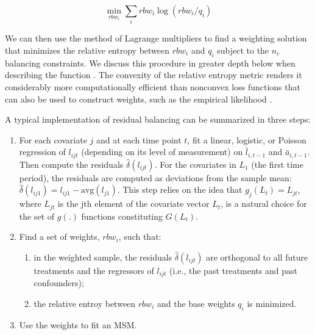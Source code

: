 \begin{equation}
\label{eq:7}
\min_{rbw_{i}}\sum_{i}rbw_{i}\log (rbw_{i}/q_{i})
\end{equation}

We can then use the method of Lagrange multipliers to find a weighting
solution that minimizes the relative entropy between \(rbw_{i}\) and
\(q_{i}\) subject to the \(n_{c}\) balancing constraints. We discuss
this procedure in greater depth below when describing the function
. The convexity of the relative entropy metric renders
it considerably more computationally efficient than nonconvex loss
functions that can also be used to construct weights, such as the
empirical likelihood \citep{fongCovariateBalancingPropensity2018}.

A typical implementation of residual balancing can be summarized in
three steps:

\begin{enumerate}
\def\labelenumi{\arabic{enumi}.}
\tightlist
\item
  For each covariate \(j\) and at each time point \(t\), fit a linear,
  logistic, or Poisson regression of \(l_{ijt}\) (depending on its level
  of measurement) on \(\bar{l}_{i,t-1}\) and \(\bar{a}_{i,t-1}\). Then
  compute the residuals \(\hat{\delta}(l_{ijt})\). For the covariates in
  \(L_{1}\) (the first time period), the residuals are computed as
  deviations from the sample mean:
  \(\hat{\delta}(l_{ij1})=l_{ij1}-\text{avg}(l_{j1})\). This step relies
  on the idea that \(g_{j}(L_{t})=L_{jt}\), where \(L_{jt}\) is the jth
  element of the covariate vector \(L_{t}\), is a natural choice for the
  set of \(g(.)\) functions constituting \(G(L_{t})\).
\item
  Find a set of weights, \(rbw_{i}\), such that:

  \begin{enumerate}
  \def\labelenumii{\alph{enumii})}
  \tightlist
  \item
    in the weighted sample, the residuals \(\hat{\delta}(l_{ijt})\) are
    orthogonal to all future treatments and the regressors of
    \(l_{ijt}\) (i.e., the past treatments and past confounders);
  \item
    the relative entroy between \(rbw_{i}\) and the base weights
    \(q_{i}\) is minimized.
  \end{enumerate}
\item
  Use the weights to fit an MSM.
\end{enumerate}

